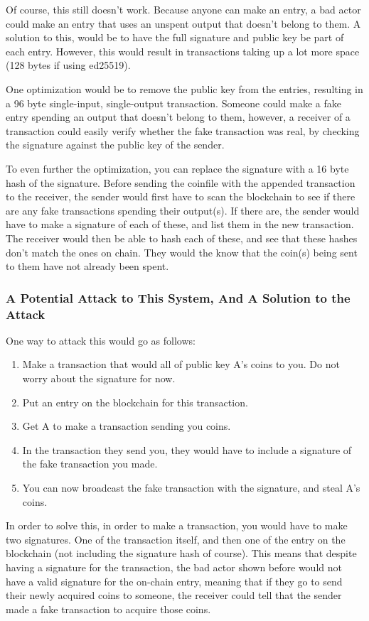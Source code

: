\documentclass[12pt, letterpaper]{article} \usepackage[utf8]{inputenc}
\begin{document}
Of course, this still doesn't work. Because anyone can make an entry, a bad
actor could make an entry that uses an unspent output that doesn't belong to
them. A solution to this, would be to have the full signature and public key be
part of each entry. However, this would result in transactions taking up a lot
more space (128 bytes if using ed25519).

One optimization would be to remove the public key from the entries, resulting
in a 96 byte single-input, single-output transaction. Someone could make a fake
entry spending an output that doesn't belong to them, however, a receiver of a
transaction could easily verify whether the fake transaction was real, by
checking the signature against the public key of the sender.

To even further the optimization, you can replace the signature with a 16 byte
hash of the signature. Before sending the coinfile with the appended
transaction to the receiver, the sender would first have to scan the blockchain
to see if there are any fake transactions spending their output(s). If there
are, the sender would have to make a signature of each of these, and list them
in the new transaction. The receiver would then be able to hash each of these,
and see that these hashes don't match the ones on chain. They would the know
that the coin(s) being sent to them have not already been spent.

\subsubsection{A Potential Attack to This System, And A Solution to the Attack}
One way to attack this would go as follows:

\begin{enumerate} \item Make a transaction that would all of public key A's
coins to you. Do not worry about the signature for now. \item Put an entry on
the blockchain for this transaction. \item Get A to make a transaction sending
you coins. \item In the transaction they send you, they would have to include a
signature of the fake transaction you made. \item You can now broadcast the
fake transaction with the signature, and steal A's coins. \end{enumerate}

In order to solve this, in order to make a transaction, you would have to make
two signatures. One of the transaction itself, and then one of the entry on the
blockchain (not including the signature hash of course). This means that
despite having a signature for the transaction, the bad actor shown before
would not have a valid signature for the on-chain entry, meaning that if they
go to send their newly acquired coins to someone, the receiver could tell that
the sender made a fake transaction to acquire those coins.
\end{document}
